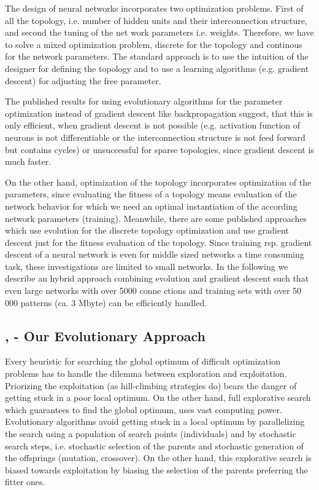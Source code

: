 The design of neural networks incorporates two optimization
problems. First of all the topology, i.e. number of hidden units and
their interconnection structure, and second the tuning of the net work
parameters i.e. weights. Therefore, we have to solve a mixed
optimization problem, discrete for the topology and continous for the
network parameters. The standard approach is to use the intuition of
the designer for defining the topology and to use a learning
algorithms (e.g. gradient descent) for adjusting the free parameter.

The published results for using evolutionary algorithms for the
parameter optimization instead of gradient descent like
backpropagation suggest, that this is only efficient, when gradient
descent is not possible (e.g. activation function of neurons is not
differentiable or the interconnection structure is not feed forward
but contains cycles) or unsuccessful for sparse topologies, since
gradient descent is much faster.

On the other hand, optimization of the topology incorporates
optimization of the parameters, since evaluating the fitness of a
topology means evaluation of the network behavior for which we need an
optimal instantiation of the according network parameters (training).
Meanwhile, there are some published approaches which use evolution for
the discrete topology optimization and use gradient descent just for
the fitness evaluation of the topology. Since training rsp. gradient
descent of a neural network is even for middle sized networks a time
consuming task, these investigations are limited to small
networks. In the following we describe an hybrid approach combining
evolution and gradient descent such that even large networks with over
5000 conne ctions and training sets with over 50 000 patterns (ca. 3
Mbyte) can be efficiently handled.




\subsection{\ENZO, - Our Evolutionary Approach}



Every heuristic for searching the global optimum of difficult
optimization problems has to handle the dilemma between exploration
and exploitation.  Priorizing the exploitation (as hill-climbing
strategies do) bears the danger of getting stuck in a poor local
optimum. On the other hand, full explorative search which guarantees
to find the global optimum, uses vast computing power.  Evolutionary
algorithms avoid getting stuck in a local optimum by parallelizing the
search using a population of search points (individuals) and by
stochastic search steps, i.e. stochastic selection of the parents and
stochastic generation of the offsprings (mutation, crossover). On the
other hand, this explorative search is biased towards exploitation by
biasing the selection of the parents preferring the fitter ones.

